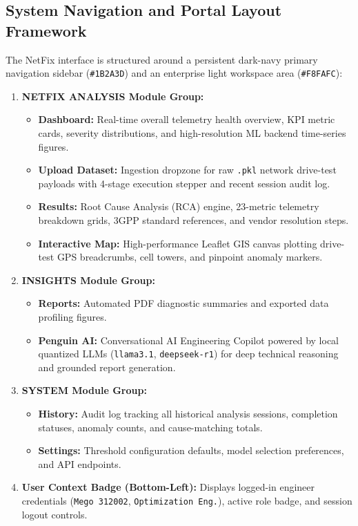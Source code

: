\documentclass[12pt,a4paper]{report}
\begin{document}
\subsection{System Navigation and Portal Layout Framework}
The NetFix interface is structured around a persistent dark-navy primary navigation sidebar (\texttt{\#1B2A3D}) and an enterprise light workspace area (\texttt{\#F8FAFC}):
\begin{enumerate}
    \item \textbf{NETFIX ANALYSIS Module Group:}
    \begin{itemize}
        \item \textbf{Dashboard:} Real-time overall telemetry health overview, KPI metric cards, severity distributions, and high-resolution ML backend time-series figures.
        \item \textbf{Upload Dataset:} Ingestion dropzone for raw \texttt{.pkl} network drive-test payloads with 4-stage execution stepper and recent session audit log.
        \item \textbf{Results:} Root Cause Analysis (RCA) engine, 23-metric telemetry breakdown grids, 3GPP standard references, and vendor resolution steps.
        \item \textbf{Interactive Map:} High-performance Leaflet GIS canvas plotting drive-test GPS breadcrumbs, cell towers, and pinpoint anomaly markers.
    \end{itemize}
    \item \textbf{INSIGHTS Module Group:}
    \begin{itemize}
        \item \textbf{Reports:} Automated PDF diagnostic summaries and exported data profiling figures.
        \item \textbf{Penguin AI:} Conversational AI Engineering Copilot powered by local quantized LLMs (\texttt{llama3.1}, \texttt{deepseek-r1}) for deep technical reasoning and grounded report generation.
    \end{itemize}
    \item \textbf{SYSTEM Module Group:}
    \begin{itemize}
        \item \textbf{History:} Audit log tracking all historical analysis sessions, completion statuses, anomaly counts, and cause-matching totals.
        \item \textbf{Settings:} Threshold configuration defaults, model selection preferences, and API endpoints.
    \end{itemize}
    \item \textbf{User Context Badge (Bottom-Left):} Displays logged-in engineer credentials (\texttt{Mego 312002}, \texttt{Optimization Eng.}), active role badge, and session logout controls.
\end{enumerate}
\end{document}
